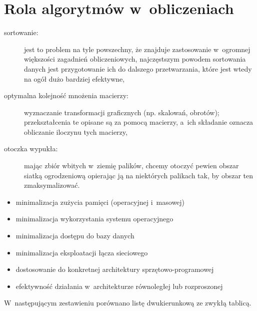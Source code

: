 \chapter{Rola algorytmów w~obliczeniach}


\exercise %
\begin{description}
	\item[sortowanie:] jest to problem na tyle powszechny, że znajduje zastosowanie w~ogromnej większości zagadnień obliczeniowych, najczęstszym powodem sortowania danych jest przygotowanie ich do dalszego przetwarzania, które jest wtedy na ogół dużo bardziej efektywne,
	\item[optymalna kolejność mnożenia macierzy:] wyznaczanie transformacji graficznych (np. skalowań, obrotów); przekształcenia te opisane są za pomocą macierzy, a~ich składanie oznacza obliczanie iloczynu tych macierzy,
	\item[otoczka wypukła:] mając zbiór wbitych w~ziemię palików, chcemy otoczyć pewien obszar siatką ogrodzeniową opierając ją na niektórych palikach tak, by obszar ten zmaksymalizować.
\end{description}

\exercise %
\begin{itemize}
	\item minimalizacja zużycia pamięci (operacyjnej i~masowej)
	\item minimalizacja wykorzystania systemu operacyjnego
	\item minimalizacja dostępu do bazy danych
	\item minimalizacja eksploatacji łącza sieciowego
	\item dostosowanie do konkretnej architektury sprzętowo-programowej
	\item efektywność działania w~architekturze równoległej lub rozproszonej
\end{itemize}

\exercise %
W~następującym zestawieniu porównano listę dwukierunkową ze zwykłą tablicą.

